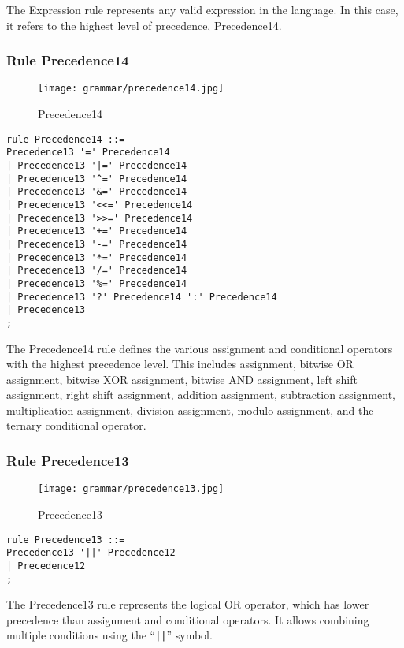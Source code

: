 The Expression rule represents any valid expression in the language. In this case, it refers to the highest level of precedence, Precedence14.

\subsubsection*{Rule Precedence14}

\begin{figure}[!ht]
\centering
\texttt{[image: grammar/precedence14.jpg]}
\caption{Precedence14}
\end{figure}

\begin{lstlisting}
rule Precedence14 ::=
Precedence13 '=' Precedence14
| Precedence13 '|=' Precedence14
| Precedence13 '^=' Precedence14
| Precedence13 '&=' Precedence14
| Precedence13 '<<=' Precedence14
| Precedence13 '>>=' Precedence14
| Precedence13 '+=' Precedence14
| Precedence13 '-=' Precedence14
| Precedence13 '*=' Precedence14
| Precedence13 '/=' Precedence14
| Precedence13 '%=' Precedence14
| Precedence13 '?' Precedence14 ':' Precedence14
| Precedence13
;
\end{lstlisting}

The Precedence14 rule defines the various assignment and conditional operators with the highest precedence level. This includes assignment, bitwise OR assignment, bitwise XOR assignment, bitwise AND assignment, left shift assignment, right shift assignment, addition assignment, subtraction assignment, multiplication assignment, division assignment, modulo assignment, and the ternary conditional operator.

\subsubsection*{Rule Precedence13}

\begin{figure}[!ht]
\centering
\texttt{[image: grammar/precedence13.jpg]}
\caption{Precedence13}
\end{figure}

\begin{lstlisting}
rule Precedence13 ::=
Precedence13 '||' Precedence12
| Precedence12
;
\end{lstlisting}

The Precedence13 rule represents the logical OR operator, which has lower precedence than assignment and conditional operators. It allows combining multiple conditions using the ``\verb!||!'' symbol.

